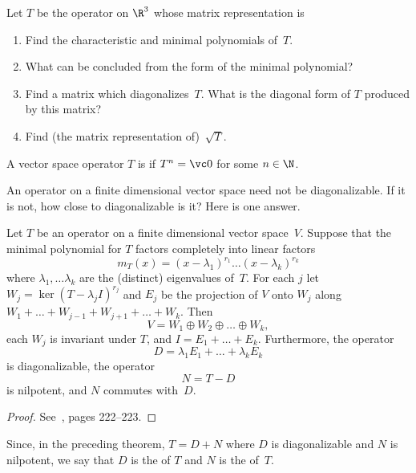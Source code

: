 \begin{exer} Let $T$ be the operator on $\R^3$ whose matrix representation is
  \begin{enumerate}
    \item Find the characteristic and minimal polynomials of~$T$.
    \item What can be concluded from the form of the minimal polynomial?
    \item Find a matrix which diagonalizes~$T$. What is the diagonal form of $T$ produced by this matrix?
    \item Find (the matrix representation of)~$\sqrt T$.
  \end{enumerate}
\end{exer}

\begin{defn} A vector space operator $T$ is
 if $T^n = \vc 0$ for some $n \in \N$.
\end{defn}

An operator on a finite dimensional vector space need not be diagonalizable.  If it is not,
how close to diagonalizable is it?  Here is one answer.

\begin{thm} Let $T$ be an operator on a finite dimensional vector space~$V$.  Suppose that the minimal
polynomial for $T$ factors completely into linear factors
   \[ m_T(x) = (x - \lambda_1)^{r_1} \dots (x - \lambda_k)^{r_k} \]
where $\lambda_1, \dots \lambda_k$ are the (distinct) eigenvalues of~$T$. For each $j$ let
$W_j = \ker(T - \lambda_jI)^{r_j}$ and $E_j$ be the projection of $V$ onto $W_j$ along
$W_1 + \dots + W_{j-1} + W_{j+1} + \dots + W_k$. Then
   \[ V = W_1 \oplus W_2 \oplus \dots \oplus W_k, \]
each $W_j$ is invariant under $T$, and $I = E_1 + \dots + E_k$. Furthermore, the operator
   \[ D = \lambda_1E_1 + \dots + \lambda_kE_k \]
is diagonalizable, the operator
   \[ N = T - D \]
is nilpotent, and $N$ commutes with~$D$.
\end{thm}

\begin{proof} See~\cite{HoffmanK:1971}, pages 222--223. \ns
\end{proof}

\begin{defn} Since, in the preceding theorem, $T = D + N$ where $D$ is diagonalizable and $N$ is nilpotent,
we say that $D$ is the
 of $T$ and $N$ is the
 of~$T$.
\end{defn}

